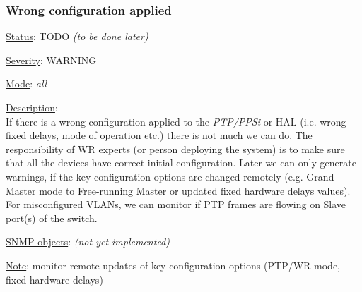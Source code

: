 \subsubsection{\bf Wrong configuration applied}
		\label{fail:timing:wrong_config}
		\begin{packed_enum}
			\item [] \underline{Status}: TODO \emph{(to be done later)}
			\item [] \underline{Severity}: WARNING
			\item [] \underline{Mode}: \emph{all}
			\item [] \underline{Description}:\\
				If there is a wrong configuration applied to the \emph{PTP/PPSi} or HAL
				(i.e.  wrong fixed delays, mode of operation etc.) there is not much we
				can do. The responsibility of WR experts (or person deploying the
				system) is to make sure that all the devices have correct initial
				configuration. Later we can only generate warnings, if the key
				configuration options are changed remotely (e.g. Grand Master mode to
				Free-running Master or updated fixed hardware delays values).\\
				For misconfigured VLANs, we can monitor if PTP frames are flowing on
				Slave port(s) of the switch.
			\item [] \underline{SNMP objects}: \emph{(not yet implemented)}
			\item [] \underline{Note}: monitor remote updates of key configuration
				options (PTP/WR mode, fixed hardware delays)
		\end{packed_enum}

